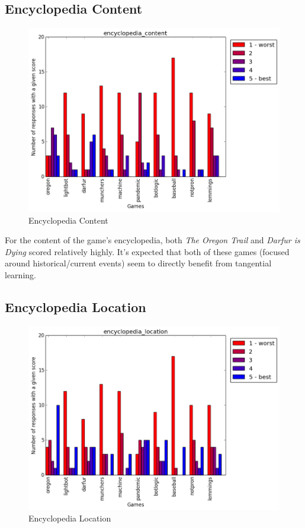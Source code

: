 			\subsection{Encyclopedia Content}
				\begin{figure}[] 
				\centering 
				\includegraphics[width=\textwidth, height=.4\textheight, keepaspectratio=true]{encyclopedia_content_scores.png} 
				\caption{Encyclopedia Content}
				\end{figure}

				For the content of the game's encyclopedia, both \textit{The Oregon Trail} and \textit{Darfur is Dying} scored relatively highly. It's expected that both of these games (focused around historical/current events) seem to directly benefit from tangential learning.

			\subsection{Encyclopedia Location}
				\begin{figure}[] 
				\centering 
				\includegraphics[width=\textwidth, height=.4\textheight, keepaspectratio=true]{encyclopedia_location_scores.png} 
				\caption{Encyclopedia Location}
				\end{figure}


